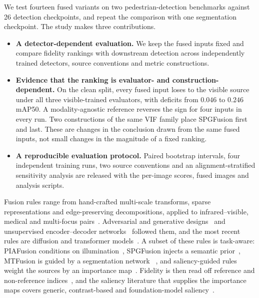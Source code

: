 \documentclass[10pt,a4paper]{article}
\begin{document}
We test fourteen fused variants on two pedestrian-detection benchmarks against 26
detection checkpoints, and repeat the comparison with one segmentation checkpoint. The
study makes three contributions.

\begin{itemize}\setlength\itemsep{0pt}
\item[(i)] \textbf{A detector-dependent evaluation.} We keep the fused inputs fixed and
compare fidelity rankings with downstream detection across independently trained
detectors, source conventions and metric constructions.
\item[(ii)] \textbf{Evidence that the ranking is evaluator- and construction-dependent.}
On the clean split, every fused input loses to the visible source under all three
visible-trained evaluators, with deficits from $0.046$ to $0.246$ mAP50. A
modality-agnostic reference reverses the sign for four inputs in every run. Two
constructions of the same VIF family place SPGFusion first and last. These are changes
in the conclusion drawn from the same fused inputs, not small changes in the magnitude
of a fixed ranking.
\item[(iii)] \textbf{A reproducible evaluation protocol.} Paired bootstrap intervals,
four independent training runs, two source conventions and an alignment-stratified
sensitivity analysis are released with the per-image scores, fused images and analysis
scripts.
\end{itemize}

Fusion rules range from hand-crafted multi-scale transforms, sparse representations and
edge-preserving decompositions, applied to infrared--visible, medical and multi-focus
pairs~\cite{zhu2017,zhang2021,yin2013,nejati2015,yin2015,wang2014,zhang2016,wei2017,fu2009,ma2021,chen2007,piella}.
Adversarial and generative designs~\cite{ma20191,hou2021,yi2021,song2022} and
unsupervised encoder--decoder networks~\cite{xu2022,li2021,li2019,zhang2020,wang2024,liu2023,hao2022,yang2023,an2024}
followed them, and the most recent rules are diffusion and transformer
models~\cite{yi2024,yang2025}. A subset of these
rules is task-aware: PIAFusion conditions on illumination~\cite{tang2022}, SPGFusion
injects a semantic prior~\cite{zhang2026}, MTFusion is guided by a segmentation network
~\cite{zhou2026}, and saliency-guided rules weight the sources by an importance
map~\cite{bianco2020,khan2025,wang2025,xu2021}. Fidelity is then read off reference and
non-reference indices~\cite{sheikh2006,ma2019}, and the saliency literature that
supplies the importance maps covers generic, contrast-based and foundation-model
saliency~\cite{qin2020,zhu2025,kirillov2023sam,bianco2020,guo2024,petilli2022,li2010}.
\end{document}
